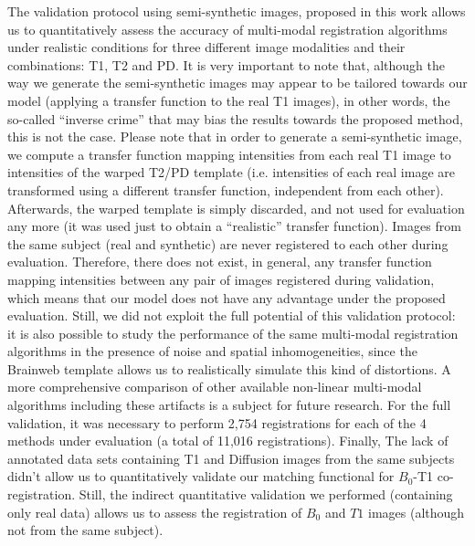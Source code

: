 The validation protocol using semi-synthetic images, proposed in this work allows us to quantitatively assess the accuracy of multi-modal registration algorithms under realistic conditions for three different image modalities and their combinations: T1, T2 and PD. It is very important to note that, although the way we generate the semi-synthetic images may appear to be tailored towards our model (applying a transfer function to the real T1 images), in other words, the so-called ``inverse crime'' that may bias the results towards the proposed method, this is not the case. Please note that in order to generate a semi-synthetic image, we compute a transfer function mapping intensities from each real T1 image to intensities of the warped T2/PD template (i.e. intensities of each real image are transformed using a different transfer function, independent from each other). Afterwards, the warped template is simply discarded, and not used for evaluation any more (it was used just to obtain a ``realistic'' transfer function). Images from the same subject (real and synthetic) are never registered to each other during evaluation. Therefore, there does not exist, in general, any transfer function mapping intensities between any pair of images registered during validation, which means that our model does not have any advantage under the proposed evaluation. Still, we did not exploit the full potential of this validation protocol: it is also possible to study the performance of the same multi-modal registration algorithms in the presence of noise and spatial inhomogeneities, since the Brainweb template allows us to realistically simulate this kind of distortions. A more comprehensive comparison of other available non-linear multi-modal algorithms including these artifacts is a subject for future research. For the full validation, it was necessary to perform 2,754 registrations for each of the 4 methods under evaluation (a total of 11,016 registrations). Finally, The lack of annotated data sets containing T1 and Diffusion images from the same subjects didn't allow us to quantitatively validate our matching functional for $B_{0}$-T1 co-registration. Still, the indirect quantitative validation we performed (containing only real data) allows us to assess the registration of $B_{0}$ and $T1$ images (although not from the same subject).\\


